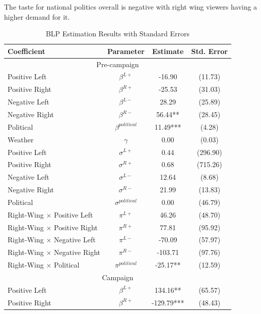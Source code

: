 \documentclass[12pt]{article}
\begin{document}
	The taste for national politics overall is negative with right wing viewers having a higher demand for it. 
	
	
	
	\begin{table}[ht]
					\caption{BLP Estimation Results with Standard Errors}
					\label{tab:results_blp}
		\centering
		\begin{threeparttable}
			\begin{tabular}{lccc}
				\hline
				\textbf{Coefficient} & \textbf{Parameter} & \textbf{Estimate} & \textbf{Std. Error} \\
				\hline
				\multicolumn{4}{c}{Pre-campaign} \\
				\hline
				\hline
				Positive Left & $\beta^{L+}$ & -16.90 & (11.73) \\
				Positive Right & $\beta^{R+}$ & -25.53 & (31.03) \\
				Negative Left & $\beta^{L-}$ & 28.29 & (25.89) \\
				Negative Right & $\beta^{R-}$ & 56.44** & (28.45) \\
				Political & $\beta^{political}$ & 11.49*** & (4.28) \\
				Weather & $\gamma$ & 0.00 & (0.03) \\
				\hline
				Positive Left & $\sigma^{L+}$ & 0.44 & (296.90) \\
				Positive Right & $\sigma^{R+}$ & 0.68 & (715.26) \\
				Negative Left & $\sigma^{L-}$ & 12.64 & (8.68) \\
				Negative Right & $\sigma^{R-}$ & 21.99 & (13.83) \\
				Political & $\sigma^{political}$ & 0.00 & (46.79) \\
				\hline
				Right-Wing $\times$  Positive Left & $\pi^{L+}$ & 46.26 & (48.70) \\
				Right-Wing $\times$  Positive Right & $\pi^{R+}$ & 77.81 & (95.92) \\
				Right-Wing $\times$  Negative Left & $\pi^{L-}$ & -70.09 & (57.97) \\
				Right-Wing $\times$  Negative Right & $\pi^{R-}$ & -103.71 & (97.76) \\
				Right-Wing $\times$  Political & $\pi^{political}$ & -25.17** & (12.59) \\
				\hline
				\hline
				\multicolumn{4}{c}{Campaign} \\
				\hline
				\hline
				Positive Left & $\beta^{L+}$ & 134.16** & (65.57) \\
				Positive Right & $\beta^{R+}$ & -129.79*** & (48.43) \\

\end{tabular}
\end{threeparttable}
\end{table}
\end{document}
